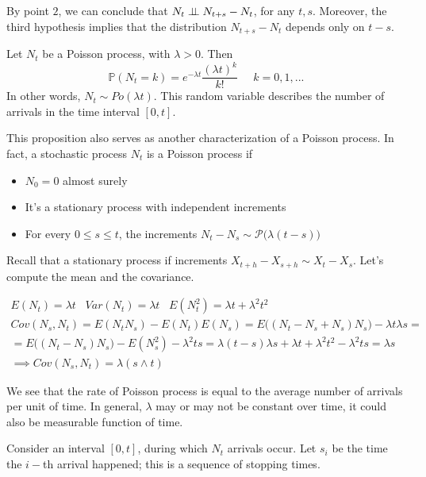 By point $2$, we can conclude that $N_t \perp \!\!\! \perp N_{t+s}-N_t$, for any $t,s$. Moreover, the third hypothesis implies that the distribution $N_{t+s}-N_t$ depends only on $t-s$.

\begin{proposition}
    Let $N_t$ be a Poisson process, with $\lambda > 0$. Then
    \begin{equation}
        \mathbb{P}(N_t = k) = e^{-\lambda t} \frac{(\lambda t )^k}{k!} \;\;\;\;\; k = 0,1,...
    \end{equation}
    In other words, $N_t \sim Po(\lambda t)$. This random variable describes the number of arrivals in the time interval $[0,t]$. 
\end{proposition}

This proposition also serves as another characterization of a Poisson process. In fact, a stochastic process $N_t$ is a Poisson process if 
\begin{itemize}
    \item $N_0 = 0$ almost surely
    \item It's a stationary process with independent increments 
    \item For every $0 \leq s \leq t$, the increments $N_t-N_s \sim \mathcal{P}\big(\lambda(t-s)\big)$
\end{itemize}

Recall that a stationary process if increments $X_{t+h}-X_{s+h} \sim X_t-X_s$. Let's compute the mean and the covariance. 

\begin{gather*}
    E(N_t) = \lambda t \;\;\; Var(N_t) = \lambda t \;\;\; E(N_t^2) = \lambda t+\lambda^2 t^2 \\
    Cov(N_s,N_t) = E(N_t N_s) - E(N_t)E(N_s) = E\Big( (N_t-N_s+N_s) N_s \Big) -\lambda t \lambda s = \\
    = E\Big( (N_t-N_s)N_s \Big)-E(N_s^2)-\lambda^2 ts = \lambda(t-s) \lambda s + \lambda t + \lambda^2 t^2 - \lambda^2 ts = \lambda s \\
    \implies Cov(N_s,N_t) = \lambda (s \wedge t)
\end{gather*}

We see that the rate of Poisson process is equal to the average number of arrivals per unit of time. In general, $\lambda$ may or may not be constant over time, it could also be measurable function of time. 

Consider an interval $[0,t]$, during which $N_t$ arrivals occur. Let $s_i$ be the time the $i-$th arrival happened; this is a sequence of stopping times.  